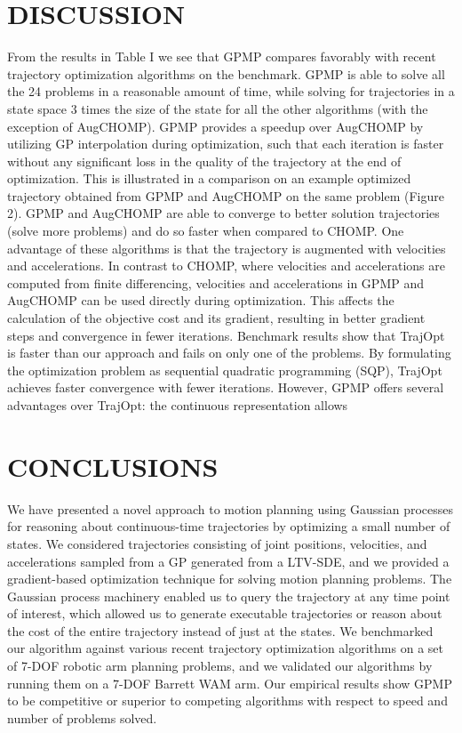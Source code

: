 \documentclass{IEEEtran}
\begin{document}
\section{DISCUSSION}
From the results in Table I we see that GPMP compares
favorably with recent trajectory optimization algorithms on
the benchmark. GPMP is able to solve all the 24 problems in
a reasonable amount of time, while solving for trajectories in
a state space 3 times the size of the state for all the other algorithms (with the exception of AugCHOMP). GPMP provides
a speedup over AugCHOMP by utilizing GP interpolation
during optimization, such that each iteration is faster without
any significant loss in the quality of the trajectory at the
end of optimization. This is illustrated in a comparison on
an example optimized trajectory obtained from GPMP and
AugCHOMP on the same problem (Figure 2).
GPMP and AugCHOMP are able to converge to better
solution trajectories (solve more problems) and do so faster
when compared to CHOMP. One advantage of these algorithms is that the trajectory is augmented with velocities and
accelerations. In contrast to CHOMP, where velocities and
accelerations are computed from finite differencing, velocities and accelerations in GPMP and AugCHOMP can be used
directly during optimization. This affects the calculation of
the objective cost and its gradient, resulting in better gradient
steps and convergence in fewer iterations.
Benchmark results show that TrajOpt is faster than our
approach and fails on only one of the problems. By formulating the optimization problem as sequential quadratic
programming (SQP), TrajOpt achieves faster convergence
with fewer iterations. However, GPMP offers several advantages over TrajOpt: the continuous representation allows
\section{CONCLUSIONS}
We have presented a novel approach to motion planning
using Gaussian processes for reasoning about continuous-time trajectories by optimizing a small number of states. We
considered trajectories consisting of joint positions, velocities, and accelerations sampled from a GP generated from
a LTV-SDE, and we provided a gradient-based optimization
technique for solving motion planning problems. The Gaussian process machinery enabled us to query the trajectory
at any time point of interest, which allowed us to generate
executable trajectories or reason about the cost of the entire
trajectory instead of just at the states. We benchmarked
our algorithm against various recent trajectory optimization
algorithms on a set of 7-DOF robotic arm planning problems,
and we validated our algorithms by running them on a 7-DOF
Barrett WAM arm. Our empirical results show GPMP to be
competitive or superior to competing algorithms with respect
to speed and number of problems solved.
\end{document}
